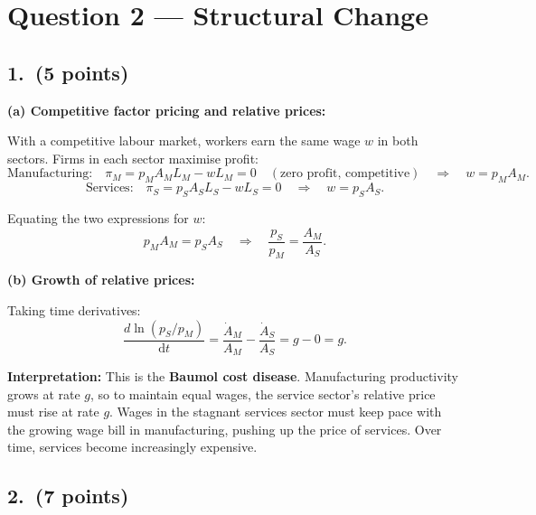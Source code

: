 \documentclass[a4paper,11pt]{article}
\newcommand{\dd}{\mathrm{d}}
\begin{document}
\clearpage

\section{Question 2 --- Structural Change}

\subsection*{1.\ (5 points)}

\begin{answerbox}
\textbf{(a) Competitive factor pricing and relative prices:}

With a competitive labour market, workers earn the same wage $w$ in both sectors. Firms in each sector maximise profit:
\[
    \text{Manufacturing:}\quad \pi_M = p_M A_M L_M - w L_M = 0 \quad(\text{zero profit, competitive})
    \quad\Longrightarrow\quad w = p_M A_M.
\]
\[
    \text{Services:}\quad \pi_S = p_S A_S L_S - w L_S = 0
    \quad\Longrightarrow\quad w = p_S A_S.
\]

Equating the two expressions for $w$:
\[
    p_M A_M = p_S A_S
    \quad\Longrightarrow\quad
    \boxed{\frac{p_S}{p_M} = \frac{A_M}{A_S}.}
\]

\textbf{(b) Growth of relative prices:}

Taking time derivatives:
\[
    \frac{d\ln(p_S/p_M)}{\dd t} = \frac{\dot{A}_M}{A_M} - \frac{\dot{A}_S}{A_S}
    = g - 0 = \boxed{g.}
\]

\textbf{Interpretation:} This is the \textbf{Baumol cost disease}. Manufacturing productivity grows at rate $g$, so to maintain equal wages, the service sector's relative price must rise at rate $g$. Wages in the stagnant services sector must keep pace with the growing wage bill in manufacturing, pushing up the price of services. Over time, services become increasingly expensive.
\end{answerbox}

\subsection*{2.\ (7 points)}
\end{document}
